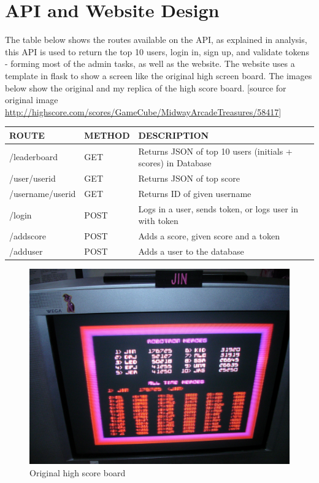 \section{API and Website Design}
The table below shows the routes available on the API, as explained in analysis, this API is used to return the top 10 users, login in, sign up, and validate tokens - forming most of the admin tasks, as well as the website. The website uses a template in flask to show a screen like the original high screen board. The images below show the original and my replica of the high score board. [source for original image \url{http://highscore.com/scores/GameCube/MidwayArcadeTreasures/58417}]

\begin{table}[!ht]
\begin{tabular}{|l|l|l|}
\hline
\rowcolor[HTML]{C0C0C0} 
ROUTE            & METHOD & DESCRIPTION                                                  \\ \hline
/leaderboard     & GET    & Returns JSON of top 10 users (initials + scores) in Database \\ \hline
/user/userid     & GET    & Returns JSON of top score                                    \\ \hline
/username/userid & GET    & Returns ID of given username                                 \\ \hline
/login           & POST   & Logs in a user, sends token, or logs user in with token      \\ \hline
/addscore        & POST   & Adds a score, given score and a token                        \\ \hline
/adduser         & POST   & Adds a user to the database                                  \\ \hline
\end{tabular}
\end{table}


\begin{figure}[H]
  \includegraphics[width=0.8\linewidth]{Figures/web1.jpg}
  \centering
  \caption{Original high score board}
  \label{fig:web1}
\end{figure}


